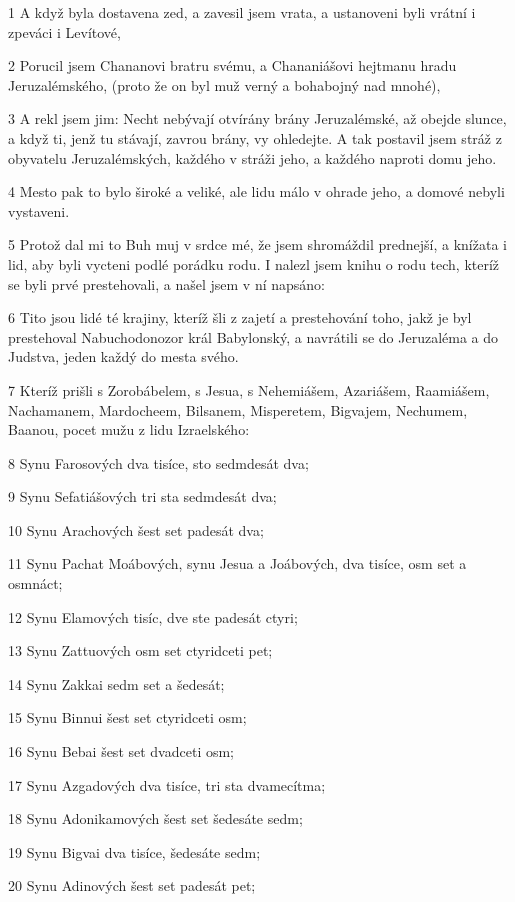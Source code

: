 \par 1 A když byla dostavena zed, a zavesil jsem vrata, a ustanoveni byli vrátní i zpeváci i Levítové,
\par 2 Porucil jsem Chananovi bratru svému, a Chananiášovi hejtmanu hradu Jeruzalémského, (proto že on byl muž verný a bohabojný nad mnohé),
\par 3 A rekl jsem jim: Necht nebývají otvírány brány Jeruzalémské, až obejde slunce, a když ti, jenž tu stávají, zavrou brány, vy ohledejte. A tak postavil jsem stráž z obyvatelu Jeruzalémských, každého v stráži jeho, a každého naproti domu jeho.
\par 4 Mesto pak to bylo široké a veliké, ale lidu málo v ohrade jeho, a domové nebyli vystaveni.
\par 5 Protož dal mi to Buh muj v srdce mé, že jsem shromáždil prednejší, a knížata i lid, aby byli vycteni podlé porádku rodu. I nalezl jsem knihu o rodu tech, kteríž se byli prvé prestehovali, a našel jsem v ní napsáno:
\par 6 Tito jsou lidé té krajiny, kteríž šli z zajetí a prestehování toho, jakž je byl prestehoval Nabuchodonozor král Babylonský, a navrátili se do Jeruzaléma a do Judstva, jeden každý do mesta svého.
\par 7 Kteríž prišli s Zorobábelem, s Jesua, s Nehemiášem, Azariášem, Raamiášem, Nachamanem, Mardocheem, Bilsanem, Misperetem, Bigvajem, Nechumem, Baanou, pocet mužu z lidu Izraelského:
\par 8 Synu Farosových dva tisíce, sto sedmdesát dva;
\par 9 Synu Sefatiášových tri sta sedmdesát dva;
\par 10 Synu Arachových šest set padesát dva;
\par 11 Synu Pachat Moábových, synu Jesua a Joábových, dva tisíce, osm set a osmnáct;
\par 12 Synu Elamových tisíc, dve ste padesát ctyri;
\par 13 Synu Zattuových osm set ctyridceti pet;
\par 14 Synu Zakkai sedm set a šedesát;
\par 15 Synu Binnui šest set ctyridceti osm;
\par 16 Synu Bebai šest set dvadceti osm;
\par 17 Synu Azgadových dva tisíce, tri sta dvamecítma;
\par 18 Synu Adonikamových šest set šedesáte sedm;
\par 19 Synu Bigvai dva tisíce, šedesáte sedm;
\par 20 Synu Adinových šest set padesát pet;
